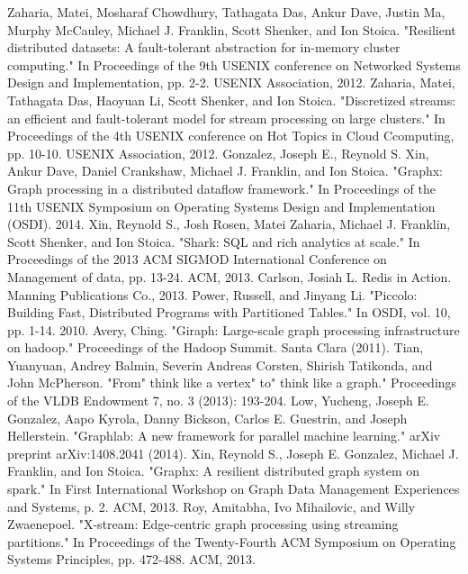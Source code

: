 \documentclass[conference]{IEEEtran}
\begin{document}
\begin{thebibliography}{1}
Zaharia, Matei, Mosharaf Chowdhury, Tathagata Das, Ankur Dave, Justin Ma, Murphy McCauley, Michael J. Franklin, Scott Shenker, and Ion Stoica. "Resilient distributed datasets: A fault-tolerant abstraction for in-memory cluster computing." In Proceedings of the 9th USENIX conference on Networked Systems Design and Implementation, pp. 2-2. USENIX Association, 2012.
Zaharia, Matei, Tathagata Das, Haoyuan Li, Scott Shenker, and Ion Stoica. "Discretized streams: an efficient and fault-tolerant model for stream processing on large clusters." In Proceedings of the 4th USENIX conference on Hot Topics in Cloud Ccomputing, pp. 10-10. USENIX Association, 2012.
Gonzalez, Joseph E., Reynold S. Xin, Ankur Dave, Daniel Crankshaw, Michael J. Franklin, and Ion Stoica. "Graphx: Graph processing in a distributed dataflow framework." In Proceedings of the 11th USENIX Symposium on Operating Systems Design and Implementation (OSDI). 2014.
Xin, Reynold S., Josh Rosen, Matei Zaharia, Michael J. Franklin, Scott Shenker, and Ion Stoica. "Shark: SQL and rich analytics at scale." In Proceedings of the 2013 ACM SIGMOD International Conference on Management of data, pp. 13-24. ACM, 2013.
Carlson, Josiah L. Redis in Action. Manning Publications Co., 2013.
Power, Russell, and Jinyang Li. "Piccolo: Building Fast, Distributed Programs with Partitioned Tables." In OSDI, vol. 10, pp. 1-14. 2010.
Avery, Ching. "Giraph: Large-scale graph processing infrastructure on hadoop." Proceedings of the Hadoop Summit. Santa Clara (2011).
Tian, Yuanyuan, Andrey Balmin, Severin Andreas Corsten, Shirish Tatikonda, and John McPherson. "From" think like a vertex" to" think like a graph." Proceedings of the VLDB Endowment 7, no. 3 (2013): 193-204.
Low, Yucheng, Joseph E. Gonzalez, Aapo Kyrola, Danny Bickson, Carlos E. Guestrin, and Joseph Hellerstein. "Graphlab: A new framework for parallel machine learning." arXiv preprint arXiv:1408.2041 (2014).
Xin, Reynold S., Joseph E. Gonzalez, Michael J. Franklin, and Ion Stoica. "Graphx: A resilient distributed graph system on spark." In First International Workshop on Graph Data Management Experiences and Systems, p. 2. ACM, 2013.
Roy, Amitabha, Ivo Mihailovic, and Willy Zwaenepoel. "X-stream: Edge-centric graph processing using streaming partitions." In Proceedings of the Twenty-Fourth ACM Symposium on Operating Systems Principles, pp. 472-488. ACM, 2013.

\end{thebibliography}
\end{document}

